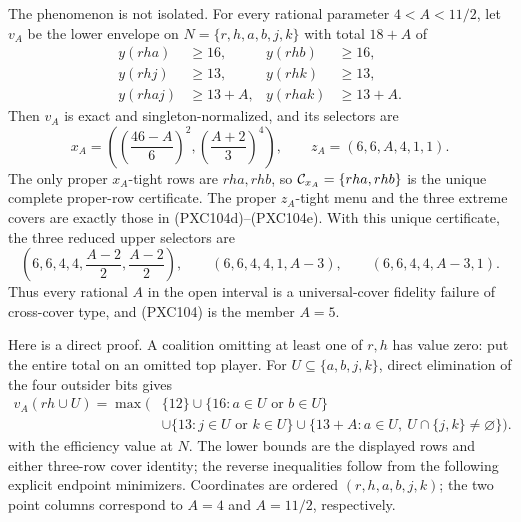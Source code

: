 \documentclass[11pt]{article}
\begin{document}
The phenomenon is not isolated.  For every rational parameter
\(4<A<11/2\), let \(v_A\) be the lower envelope on
\(N=\{r,h,a,b,j,k\}\) with total \(18+A\) of
\begin{equation}
\begin{aligned}
 y(rha)&\ge16,& y(rhb)&\ge16,\\
 y(rhj)&\ge13,& y(rhk)&\ge13,\\
 y(rhaj)&\ge13+A,& y(rhak)&\ge13+A.
\end{aligned}                                                 \tag{PXC105a}
\end{equation}
Then \(v_A\) is exact and singleton-normalized, and its selectors are
\begin{equation}
 x_A=\left(\left(\frac{46-A}{6}\right)^2,
            \left(\frac{A+2}{3}\right)^4\right),\qquad
 z_A=(6,6,A,4,1,1).                                          \tag{PXC105b}
\end{equation}
The only proper \(x_A\)-tight rows are \(rha,rhb\), so
\({\cal C}_{x_A}=\{rha,rhb\}\) is the unique complete proper-row
certificate.  The proper \(z_A\)-tight menu and the three extreme covers
are exactly those in (PXC104d)--(PXC104e).  With this unique certificate,
the three reduced upper selectors are
\begin{equation}
 \left(6,6,4,4,\frac{A-2}{2},\frac{A-2}{2}\right),\qquad
 (6,6,4,4,1,A-3),\qquad
 (6,6,4,4,A-3,1).                                            \tag{PXC105c}
\end{equation}
Thus every rational \(A\) in the open interval is a universal-cover
fidelity failure of cross-cover type, and (PXC104) is the member \(A=5\).

Here is a direct proof.  A coalition omitting at least one of \(r,h\) has
value zero: put the entire total on an omitted top player.  For
\(U\subseteq\{a,b,j,k\}\), direct elimination of the four outsider bits
gives
\begin{equation}
\begin{aligned}
 v_A(rh\cup U)=\max\bigl(&\{12\}
 \cup\{16:a\in U\text{ or }b\in U\}\\
 &\cup\{13:j\in U\text{ or }k\in U\}
 \cup\{13+A:a\in U,\ U\cap\{j,k\}\ne\varnothing\}\bigr).
\end{aligned}                                                 \tag{PXC105d}
\end{equation}
with the efficiency value at \(N\).  The lower bounds are the displayed
rows and either three-row cover identity; the reverse inequalities follow
from the following explicit endpoint minimizers.  Coordinates are ordered
\((r,h,a,b,j,k)\); the two point columns correspond to \(A=4\) and
\(A=11/2\), respectively.
\end{document}
